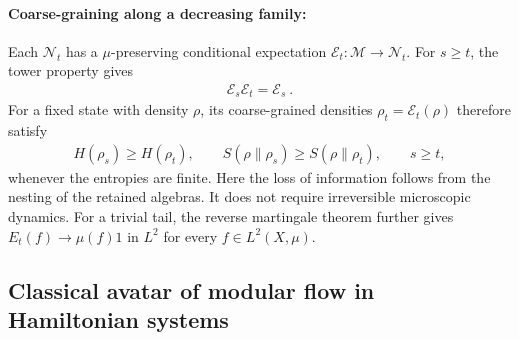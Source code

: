 \documentclass[a4paper,11pt]{article}
\theoremstyle{definition}
\begin{document}
\paragraph{Coarse-graining along a decreasing family:}
Each $\mathcal N_t$ has a $\mu$-preserving conditional expectation $\mathcal{E}_t:\mathcal M\to\mathcal N_t$. For $s\geq t$, the tower property gives
\begin{align}
    \mathcal{E}_s\mathcal{E}_t=\mathcal{E}_s\ .
\end{align}
For a fixed state with density $\rho$, its coarse-grained densities $\rho_t=\mathcal{E}_t(\rho)$ therefore satisfy
\begin{align}
    H(\rho_s)\geq H(\rho_t),
    \qquad
    S(\rho\|\rho_s)\geq S(\rho\|\rho_t),
    \qquad s\geq t,
\end{align}
whenever the entropies are finite. Here the loss of information follows from the nesting of the retained algebras. It does not require irreversible microscopic dynamics. For a trivial tail, the reverse martingale theorem further gives $E_t(f)\to\mu(f)1$ in $L^2$ for every $f\in L^2(X,\mu)$.



\subsection{Classical avatar of modular flow in Hamiltonian systems}
\label{subsec:classical-state-flow}
\end{document}
